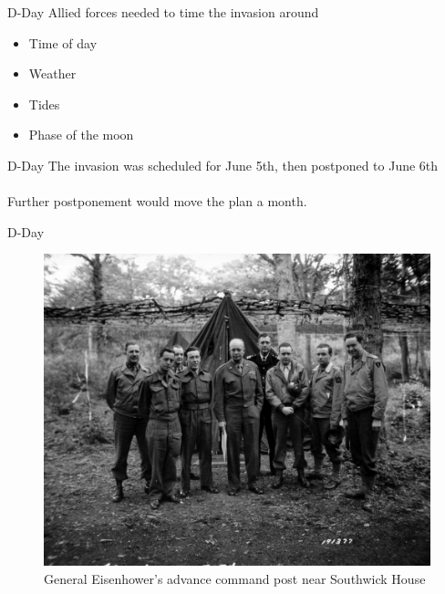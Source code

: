 \documentclass[hyphens,aspectratio=169]{beamer}
\begin{document}
\begin{frame}[fragile]{D-Day}
	Allied forces needed to time the invasion around
	\begin{itemize}
		\item Time of day
		      \pause
		\item Weather
		      \pause
		\item Tides
		      \pause
		\item Phase of the moon
	\end{itemize}

\end{frame}

\begin{frame}[fragile]{D-Day}
	The invasion was scheduled for June 5th,
	\pause
	then postponed to June 6th
	\pause
	\\\\Further postponement would move the plan a month.
\end{frame}

\begin{frame}[fragile]{D-Day}
	\begin{center}
		\begin{figure}
			\includegraphics[scale=0.21]{paper/images/general_eisenhower.jpg}
			\small
			\caption{General Eisenhower's advance command post near Southwick House}
		\end{figure}

	\end{center}
\end{frame}
\end{document}

